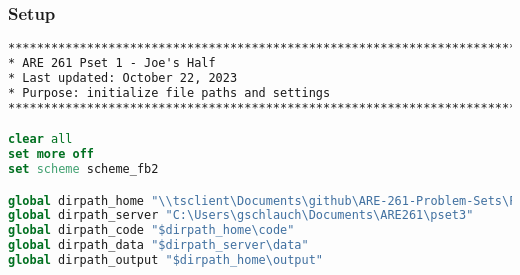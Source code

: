 \documentclass[12pt]{article}
\begin{document}
\subsubsection*{Setup}
\footnotesize
\begin{lstlisting}[language=Stata, numbers=none]
********************************************************************************
* ARE 261 Pset 1 - Joe's Half
* Last updated: October 22, 2023
* Purpose: initialize file paths and settings
********************************************************************************

clear all
set more off
set scheme scheme_fb2

global dirpath_home "\\tsclient\Documents\github\ARE-261-Problem-Sets\Pset3"
global dirpath_server "C:\Users\gschlauch\Documents\ARE261\pset3"
global dirpath_code "$dirpath_home\code"
global dirpath_data "$dirpath_server\data"
global dirpath_output "$dirpath_home\output"
\end{lstlisting}
\end{document}
